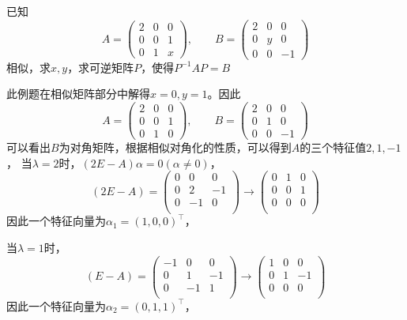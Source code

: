 \begin{example}
    已知
    \[
        A =
        \begin{pmatrix}
            2 & 0 & 0 \\
            0 & 0 & 1 \\
            0 & 1 & x
        \end{pmatrix}
        ,\qquad
        B =
        \begin{pmatrix}
            2 & 0 & 0  \\
            0 & y & 0  \\
            0 & 0 & -1
        \end{pmatrix}
    \]
    相似，求$x,y$，求可逆矩阵$P$，使得$P^{-1}AP=B$
\end{example}
\begin{solution}
    此例题在相似矩阵部分中解得$x=0,y=1$。因此
    \[
        A =
        \begin{pmatrix}
            2 & 0 & 0 \\
            0 & 0 & 1 \\
            0 & 1 & 0
        \end{pmatrix}
        ,\qquad
        B =
        \begin{pmatrix}
            2 & 0 & 0  \\
            0 & 1 & 0  \\
            0 & 0 & -1
        \end{pmatrix}
    \]
    可以看出$B$为对角矩阵，根据相似对角化的性质，可以得到$A$的三个特征值$2,1,-1$，
    当$\lambda=2$时，$(2E-A)\alpha=0(\alpha\neq 0)$，
    \[
        (2E-A) =
        \begin{pmatrix}
            0 & 0  & 0  \\
            0 & 2  & -1 \\
            0 & -1 & 0  \\
        \end{pmatrix}
        \longrightarrow
        \begin{pmatrix}
            0 & 1 & 0 \\
            0 & 0 & 1 \\
            0 & 0 & 0 \\
        \end{pmatrix}
    \]
    因此一个特征向量为$\alpha_1 = (1,0,0)^\intercal$，

    当$\lambda = 1$时，
    \[
        (E-A) =
        \begin{pmatrix}
            -1 & 0  & 0  \\
            0  & 1  & -1 \\
            0  & -1 & 1  \\
        \end{pmatrix}
        \longrightarrow
        \begin{pmatrix}
            1 & 0 & 0  \\
            0 & 1 & -1 \\
            0 & 0 & 0  \\
        \end{pmatrix}
    \]
    因此一个特征向量为$\alpha_2 = (0,1,1)^\intercal$，


\end{solution}
